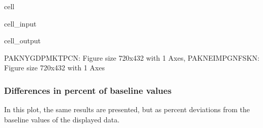 \documentclass[letterpaper,10pt,english]{jupyterBook}
\begin{document}
\begin{sphinxuseclass}{cell}\begin{sphinxVerbatimInput}

\begin{sphinxuseclass}{cell_input}
\begin{sphinxVerbatim}[commandchars=\\\{\}]
 
\end{sphinxVerbatim}

\end{sphinxuseclass}\end{sphinxVerbatimInput}
\begin{sphinxVerbatimOutput}

\begin{sphinxuseclass}{cell_output}
\begin{sphinxVerbatim}[commandchars=\\\{\}]
\PYGZob{}\PYGZsq{}PAKNYGDPMKTPCN\PYGZsq{}: \PYGZlt{}Figure size 720x432 with 1 Axes\PYGZgt{},
 \PYGZsq{}PAKNEIMPGNFSKN\PYGZsq{}: \PYGZlt{}Figure size 720x432 with 1 Axes\PYGZgt{}\PYGZcb{}
\end{sphinxVerbatim}

\end{sphinxuseclass}\end{sphinxVerbatimOutput}

\end{sphinxuseclass}

\subsubsection{Differences in percent of baseline values}
\label{\detokenize{content/05_WBModels/ScenarioAnalysis:differences-in-percent-of-baseline-values}}
\sphinxAtStartPar
In this plot, the same results are presented, but as percent deviations from the baseline values of the displayed data.
\end{document}

